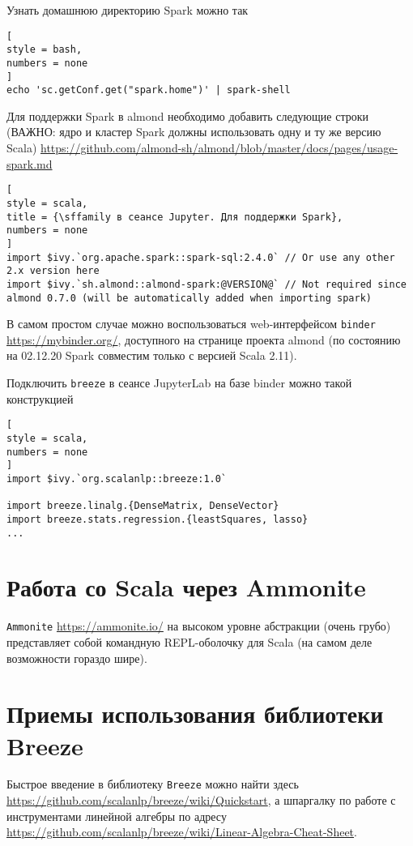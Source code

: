 \documentclass[%
	11pt,
	a4paper,
	utf8,
		]{article}
\begin{document}
Узнать домашнюю директорию Spark можно так
\begin{lstlisting}[
style = bash,
numbers = none	
]
echo 'sc.getConf.get("spark.home")' | spark-shell
\end{lstlisting}

Для поддержки Spark в almond необходимо добавить следующие строки (ВАЖНО: ядро и кластер Spark должны использовать одну и ту же версию Scala) \url{https://github.com/almond-sh/almond/blob/master/docs/pages/usage-spark.md}
\begin{lstlisting}[
style = scala,
title = {\sffamily в сеансе Jupyter. Для поддержки Spark},
numbers = none	
]
import $ivy.`org.apache.spark::spark-sql:2.4.0` // Or use any other 2.x version here
import $ivy.`sh.almond::almond-spark:@VERSION@` // Not required since almond 0.7.0 (will be automatically added when importing spark)
\end{lstlisting}

В самом простом случае можно воспользоваться web-интерфейсом \texttt{binder} \url{https://mybinder.org/}, доступного на странице проекта almond (по состоянию на 02.12.20 Spark совместим только с версией Scala 2.11).

Подключить \texttt{breeze} в сеансе JupyterLab на базе binder можно такой конструкцией
\begin{lstlisting}[
style = scala,
numbers = none	
]
import $ivy.`org.scalanlp::breeze:1.0`

import breeze.linalg.{DenseMatrix, DenseVector}
import breeze.stats.regression.{leastSquares, lasso}
...
\end{lstlisting}

\section{Работа со Scala через Ammonite}

\texttt{Ammonite} \url{https://ammonite.io/} на высоком уровне абстракции (очень грубо) представляет собой командную REPL-оболочку для Scala (на самом деле возможности гораздо шире).


\section{Приемы использования библиотеки Breeze}

Быстрое введение в библиотеку \texttt{Breeze} можно найти здесь \url{https://github.com/scalanlp/breeze/wiki/Quickstart}, а шпаргалку по работе с инструментами линейной алгебры по адресу \url{https://github.com/scalanlp/breeze/wiki/Linear-Algebra-Cheat-Sheet}.
\end{document}
